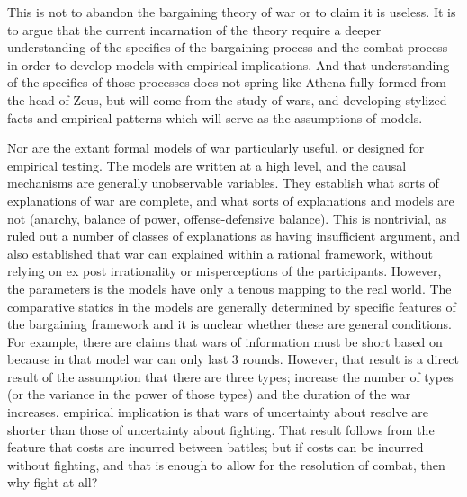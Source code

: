 This is not to abandon the bargaining theory of war or to claim it is useless. 
It is to argue that the current incarnation of the theory require a deeper understanding of the specifics of the bargaining process and the combat process in order to develop models with empirical implications.
And that understanding of the specifics of those processes does not spring like Athena fully formed from the head of Zeus, but will come from the study of wars, and developing stylized facts and empirical patterns which will serve as the assumptions of models.

Nor are the extant formal models of war particularly useful, or designed for empirical testing. %
The models are written at a high level, and the causal mechanisms are generally unobservable variables. %
They establish what sorts of explanations of war are complete, and what sorts of explanations and models are not (anarchy, balance of power, offense-defensive balance).
This is nontrivial, as \textcite{Fearon1995} ruled out a number of classes of explanations as having insufficient argument, and also established that war can explained within a rational framework, without relying on ex post irrationality or misperceptions of the participants. 
However, the parameters is the models have only a tenous mapping to the real world. %
The comparative statics in the models are generally determined by specific features of the bargaining framework and it is unclear whether these are general conditions. %
For example, there are claims that wars of information must be short based on \textcite{Slantchev2003} because in that model war can only last 3 rounds. %
However, that result is a direct result of the assumption that there are three types; increase the number of types (or the variance in the power of those types) and the duration of the war increases. %
\textcite{Powell2004} empirical implication is that wars of uncertainty about resolve are shorter than those of uncertainty about fighting. %
That result follows from the feature that costs are incurred between battles; but if costs can be incurred without fighting, and that is enough to allow for the resolution of combat, then why fight at all? 

